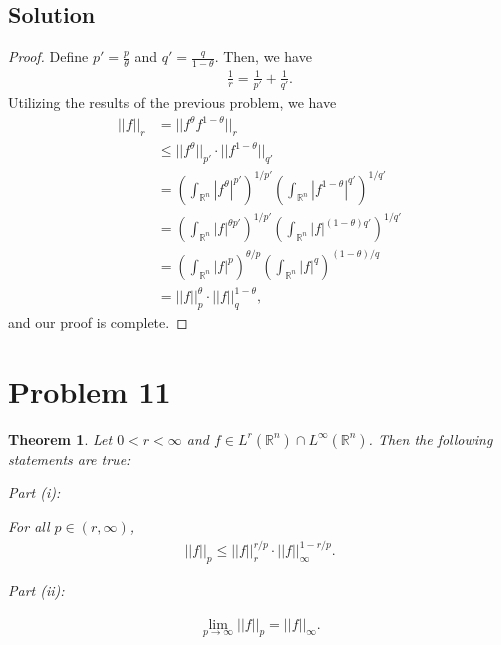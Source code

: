 \documentclass[10pt,a4paper]{article}
\makeatletter
\theoremstyle{theorem}
\newtheorem{theorem}{Theorem}
\newcommand{\proofpart}[2]{%
  \par
  \addvspace{\medskipamount}%
  \noindent\emph{Part #1: #2}\par\nobreak
  \addvspace{\smallskipamount}%
  \@afterheading
}
\theoremstyle{definition}
\makeatother
\begin{document}
\subsection*{Solution}
\begin{proof}
Define $p' = \frac{p}{\theta}$ and $q' = \frac{q}{1 - \theta}$. Then, we have
\begin{align*}
\frac{1}{r} = \frac{1}{p'} + \frac{1}{q'}.
\end{align*}
Utilizing the results of the previous problem, we have
\begin{align*}
||f||_r &= ||f^\theta f^{1 - \theta}||_r\\
&\leq ||f^\theta||_{p'} \cdot ||f^{1- \theta}||_{q'}\\
&= \left(\int_{\mathbb{R}^n} |f^\theta|^{p'} \right)^{1/p'} \left(\int_{\mathbb{R}^n} |f^{1 - \theta}|^{q'} \right)^{1/q'}\\
&= \left(\int_{\mathbb{R}^n} |f|^{\theta p'} \right)^{1/p'} \left(\int_{\mathbb{R}^n} |f|^{(1 - \theta)q'} \right)^{1/q'}\\
&= \left(\int_{\mathbb{R}^n} |f|^{p} \right)^{\theta/p} \left(\int_{\mathbb{R}^n} |f|^{q} \right)^{(1-\theta)/q}\\
&= ||f||_p^\theta \cdot ||f||_q^{1 - \theta},
\end{align*}
and our proof is complete.
\end{proof}

\section*{Problem 11}
\begin{theorem}
Let $0 < r < \infty$ and $f \in L^r(\mathbb{R}^n) \cap L^\infty(\mathbb{R}^n)$. Then the following statements are true:
\proofpart{(i)}{} For all $p \in (r, \infty)$, 
\begin{align*}
||f||_p \leq ||f||_r^{r/p} \cdot ||f||_\infty^{1 - r/p}.
\end{align*}

\proofpart{(ii)}{}
\begin{align*}
\lim_{p \to \infty} ||f||_p = ||f||_\infty.
\end{align*}
\end{theorem}
\end{document}
